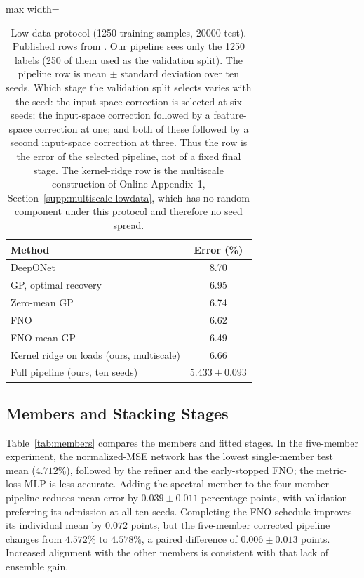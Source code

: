 \documentclass[twoside,11pt]{article}
\newcommand{\errPipe}{4.572}         %
\newcommand{\fnoGain}{0.039}         %
\newcommand{\fnoGainSd}{0.011}
\newcommand{\fnoCompleteGain}{0.072} %
\newcommand{\errMSE}{4.712}          %
\newcommand{\errBestLow}{5.433}      %
\newcommand{\errBestLowSd}{0.093}    %
\newcommand{\errKRRloadLow}{6.66}    %
\begin{document}
\begin{table}[t]
\centering

\begin{adjustbox}{max width=\linewidth}
\begin{tabular}{lc}
\toprule
Method & Error (\%) \\
\midrule
DeepONet & 8.70 \\
GP, optimal recovery \citep{batlle2024kernel} & 6.95 \\
Zero-mean GP \citep{mora2025operator} & 6.74 \\
FNO & 6.62 \\
FNO-mean GP \citep{mora2025operator} & 6.49 \\
\midrule
Kernel ridge on loads (ours, multiscale) & \errKRRloadLow \\
Full pipeline (ours, ten seeds) & $\errBestLow\pm\errBestLowSd$ \\
\bottomrule
\end{tabular}
\end{adjustbox}
\caption{Low-data protocol (1250 training samples, 20000 test). Published
rows from \citet{mora2025operator}. Our pipeline sees only the 1250 labels
(250 of them used as the validation split). The pipeline row is mean $\pm$
standard deviation over ten seeds. Which stage the validation split selects
varies with the seed: the input-space correction is selected at six seeds;
the input-space correction followed by a feature-space correction at one;
and both of these followed by a second input-space correction at three. Thus
the row is the error of the selected pipeline, not of a fixed final stage.
The kernel-ridge row is the multiscale construction of
Online Appendix~1, Section~\ref{supp:multiscale-lowdata}, which has no random component under this protocol
and therefore no seed spread.}
\label{tab:lowdata}
\end{table}
\subsection{Members and Stacking Stages}
\label{sec:members-seeds}
Table~\ref{tab:members} compares the members and fitted stages. In the five-member experiment, the normalized-MSE network has the lowest single-member test mean ($\errMSE\%$), followed by the refiner and the early-stopped FNO; the metric-loss MLP is less accurate. Adding the spectral member to the four-member pipeline reduces mean error by $\fnoGain\pm\fnoGainSd$ percentage points, with validation preferring its admission at all ten seeds. Completing the FNO schedule improves its individual mean by $\fnoCompleteGain$ points, but the five-member corrected pipeline changes from $\errPipe\%$ to $4.578\%$, a paired difference of $0.006\pm0.013$ points. Increased alignment with the other members is consistent with that lack of ensemble gain.
\end{document}
